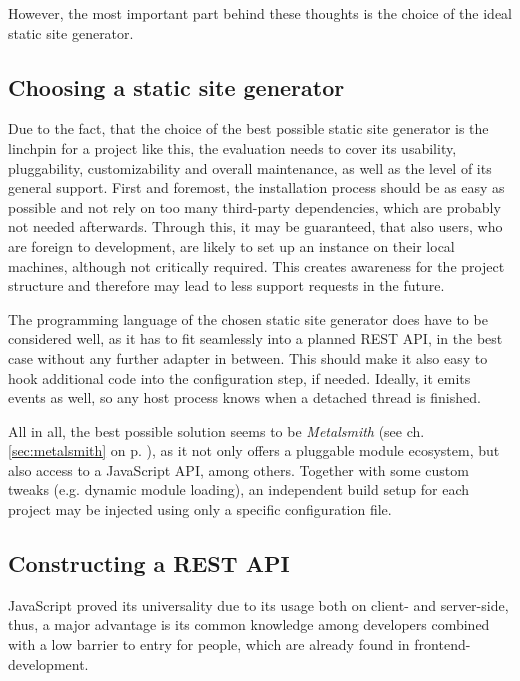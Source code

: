 However, the most important part behind these thoughts is the choice of the ideal static site generator.


\subsection{Choosing a static site generator}
\label{sec:primarythoughts-generator}

Due to the fact, that the choice of the best possible static site generator is the linchpin for a project like this, the evaluation needs to cover its usability, pluggability, customizability and overall maintenance, as well as the level of its general support. First and foremost, the installation process should be as easy as possible and not rely on too many third-party dependencies, which are probably not needed afterwards. Through this, it may be guaranteed, that also users, who are foreign to development, are likely to set up an instance on their local machines, although not critically required. This creates awareness for the project structure and therefore may lead to less support requests in the future.

The programming language of the chosen static site generator does have to be considered well, as it has to fit seamlessly into a planned REST API, in the best case without any further adapter in between. This should make it also easy to hook additional code into the configuration step, if needed. Ideally, it emits events as well, so any host process knows when a detached thread is finished.

All in all, the best possible solution seems to be \emph{Metalsmith} (see ch. \ref{sec:metalsmith} on p. \pageref{sec:metalsmith}), as it not only offers a pluggable module ecosystem, but also access to a JavaScript API, among others. Together with some custom tweaks (e.g. dynamic module loading), an independent build setup for each project may be injected using only a specific configuration file.


\subsection{Constructing a REST API}
\label{sec:primarythoughts-restapi}

JavaScript proved its universality due to its usage both on client- and server-side, thus, a major advantage is its common knowledge among developers combined with a low barrier to entry for people, which are already found in frontend-development.

